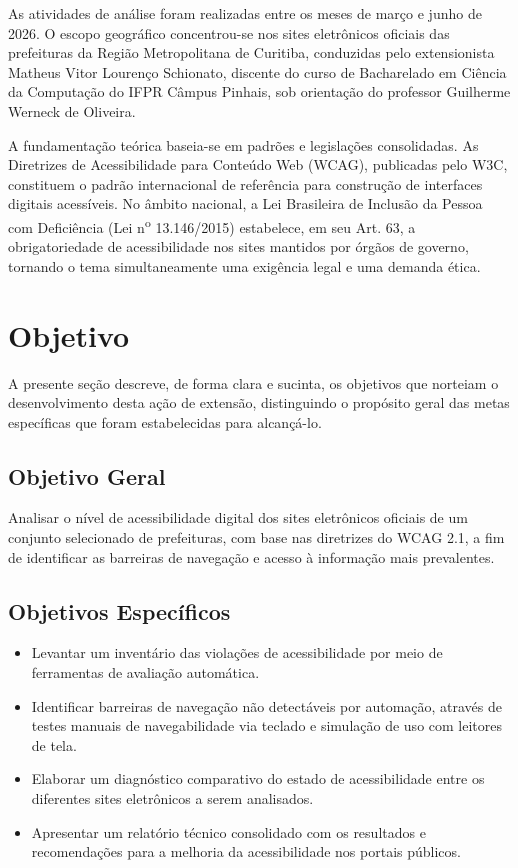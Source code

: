 \documentclass[brazil]{ifpr-pinhais}
\begin{document}
As atividades de análise foram realizadas entre os meses de março e junho de 2026. O escopo geográfico concentrou-se nos sites eletrônicos oficiais das prefeituras da Região Metropolitana de Curitiba, conduzidas pelo extensionista Matheus Vitor Lourenço Schionato, discente do curso de Bacharelado em Ciência da Computação do IFPR Câmpus Pinhais, sob orientação do professor Guilherme Werneck de Oliveira.

A fundamentação teórica baseia-se em padrões e legislações consolidadas. As Diretrizes de Acessibilidade para Conteúdo Web (WCAG), publicadas pelo W3C, constituem o padrão internacional de referência para construção de interfaces digitais acessíveis. No âmbito nacional, a Lei Brasileira de Inclusão da Pessoa com Deficiência (Lei n\textsuperscript{o} 13.146/2015) estabelece, em seu Art. 63, a obrigatoriedade de acessibilidade nos sites mantidos por órgãos de governo, tornando o tema simultaneamente uma exigência legal e uma demanda ética.

\section{Objetivo}

A presente seção descreve, de forma clara e sucinta, os objetivos que norteiam o desenvolvimento desta ação de extensão, distinguindo o propósito geral das metas específicas que foram estabelecidas para alcançá-lo.

\subsection{Objetivo Geral}

Analisar o nível de acessibilidade digital dos sites eletrônicos oficiais de um conjunto selecionado de prefeituras, com base nas diretrizes do WCAG 2.1, a fim de identificar as barreiras de navegação e acesso à informação mais prevalentes.

\subsection{Objetivos Específicos}

\begin{itemize}
  \item Levantar um inventário das violações de acessibilidade por meio de ferramentas de avaliação automática.
  \item Identificar barreiras de navegação não detectáveis por automação, através de testes manuais de navegabilidade via teclado e simulação de uso com leitores de tela.
  \item Elaborar um diagnóstico comparativo do estado de acessibilidade entre os diferentes sites eletrônicos a serem analisados.
  \item Apresentar um relatório técnico consolidado com os resultados e recomendações para a melhoria da acessibilidade nos portais públicos.
\end{itemize}
\end{document}
